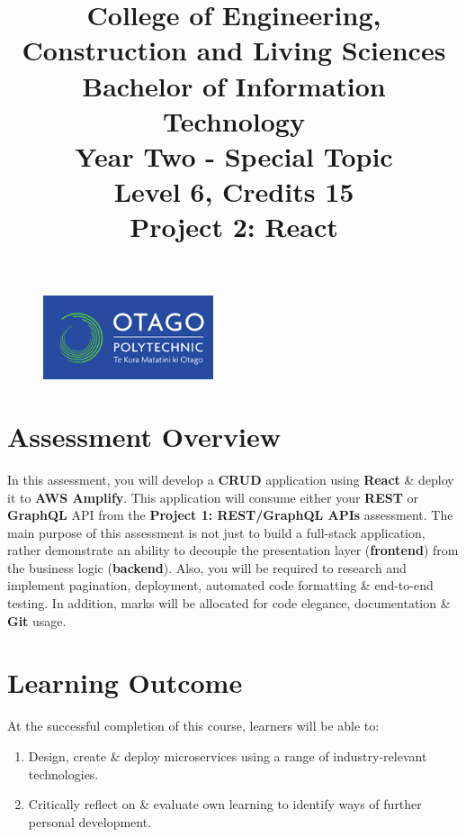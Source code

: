 \documentclass{article}
\author{}
\begin{document}
\begin{figure}
    \centering
    \includegraphics[width=50mm]{../img/logo.png}
\end{figure}

\title{College of Engineering, Construction and Living Sciences\\Bachelor of Information Technology\\Year Two - Special Topic\\Level 6, Credits 15\\\textbf{Project 2: React}}
\date{}
\maketitle

\section*{Assessment Overview}
In this assessment, you will develop a \textbf{CRUD} application using \textbf{React} \& deploy it to \textbf{AWS Amplify}. This application will consume either your \textbf{REST} or \textbf{GraphQL} API from the \textbf{Project 1: REST/GraphQL APIs} assessment. The main purpose of this assessment is not just to build a full-stack application, rather demonstrate an ability to decouple the presentation layer (\textbf{frontend}) from the business logic (\textbf{backend}). Also, you will be required to research and implement pagination, deployment, automated code formatting \& end-to-end testing. In addition, marks will be allocated for code elegance, documentation \& \textbf{Git} usage.

\section*{Learning Outcome}
At the successful completion of this course, learners will be able to:
\begin{enumerate}
    \item Design, create \& deploy microservices using a range of industry-relevant technologies. 
    \item Critically reflect on \& evaluate own learning to identify ways of further personal development.  
\end{enumerate}
\end{document}
